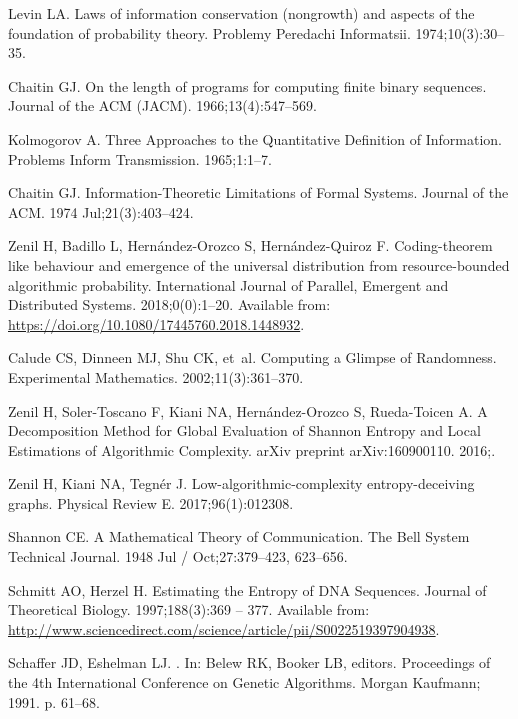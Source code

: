 \documentclass[10pt]{article}
\begin{document}
\begin{thebibliography}{10}
Levin LA.
\newblock Laws of information conservation (nongrowth) and aspects of the
  foundation of probability theory.
\newblock Problemy Peredachi Informatsii. 1974;10(3):30--35.

Chaitin GJ.
\newblock On the length of programs for computing finite binary sequences.
\newblock Journal of the ACM (JACM). 1966;13(4):547--569.

Kolmogorov A.
\newblock Three Approaches to the Quantitative Definition of Information.
\newblock Problems Inform Transmission. 1965;1:1--7.

Chaitin GJ.
\newblock Information-Theoretic Limitations of Formal Systems.
\newblock Journal of the ACM. 1974 Jul;21(3):403--424.

Zenil H, Badillo L, Hernández-Orozco S, Hernández-Quiroz F.
\newblock Coding-theorem like behaviour and emergence of the universal
  distribution from resource-bounded algorithmic probability.
\newblock International Journal of Parallel, Emergent and Distributed Systems.
  2018;0(0):1--20.
\newblock Available from: \url{https://doi.org/10.1080/17445760.2018.1448932}.

Calude CS, Dinneen MJ, Shu CK, et~al.
\newblock Computing a Glimpse of Randomness.
\newblock Experimental Mathematics. 2002;11(3):361--370.

Zenil H, Soler-Toscano F, Kiani NA, Hern{\'a}ndez-Orozco S, Rueda-Toicen A.
\newblock A Decomposition Method for Global Evaluation of Shannon Entropy and
  Local Estimations of Algorithmic Complexity.
\newblock arXiv preprint arXiv:160900110. 2016;.

Zenil H, Kiani NA, Tegn{\'e}r J.
\newblock Low-algorithmic-complexity entropy-deceiving graphs.
\newblock Physical Review E. 2017;96(1):012308.

Shannon CE.
\newblock A Mathematical Theory of Communication.
\newblock The Bell System Technical Journal. 1948 Jul / Oct;27:379--423,
  623--656.

Schmitt AO, Herzel H.
\newblock Estimating the Entropy of DNA Sequences.
\newblock Journal of Theoretical Biology. 1997;188(3):369 -- 377.
\newblock Available from:
  \url{http://www.sciencedirect.com/science/article/pii/S0022519397904938}.

Schaffer JD, Eshelman LJ.
.
\newblock In: Belew RK, Booker LB, editors. {Proceedings of the 4th
  International Conference on Genetic Algorithms}. Morgan Kaufmann; 1991. p.
  61--68.


\end{thebibliography}
\end{document}

